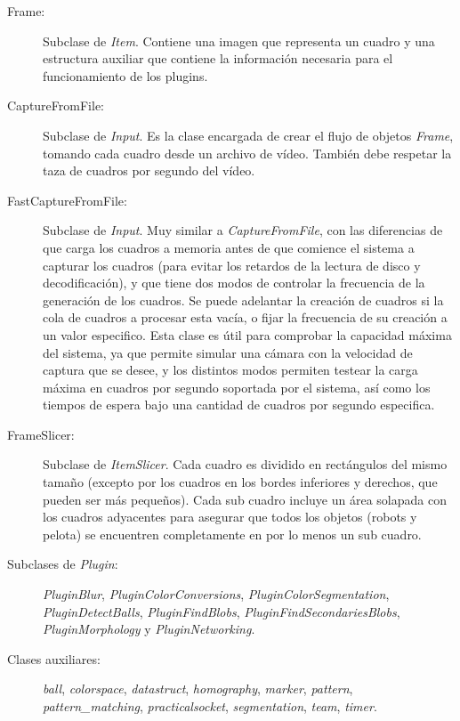 \begin{description}

	\item[Frame:] Subclase de \emph{Item}. Contiene una imagen que
		representa un cuadro y una estructura auxiliar que contiene la
		información necesaria para el funcionamiento de los plugins.

	\item[CaptureFromFile:] Subclase de \emph{Input}. Es la clase encargada
		de crear el flujo de objetos \emph{Frame}, tomando cada cuadro
		desde un archivo de vídeo. También debe respetar la taza de
		cuadros por segundo del vídeo.

	\item[FastCaptureFromFile:] Subclase de \emph{Input}. Muy similar a
		\emph{CaptureFromFile}, con las diferencias de que carga los
		cuadros a memoria antes de que comience el sistema a capturar
		los cuadros (para evitar los retardos de la lectura de disco y
		decodificación), y que tiene dos modos de controlar la
		frecuencia de la generación de los cuadros. Se puede adelantar
		la creación de cuadros si la cola de cuadros a procesar esta
		vacía, o fijar la frecuencia de su creación a un valor
		especifico. Esta clase es útil para comprobar la capacidad
		máxima del sistema, ya que permite simular una cámara con la
		velocidad de captura que se desee, y los distintos modos
		permiten testear la carga máxima en cuadros por segundo
		soportada por el sistema, así como los tiempos de espera bajo
		una cantidad de cuadros por segundo especifica.

	\item[FrameSlicer:] Subclase de \emph{ItemSlicer}. Cada cuadro es
		dividido en rectángulos del mismo tamaño (excepto por los
		cuadros en los bordes inferiores y derechos, que pueden ser
		más pequeños). Cada sub cuadro incluye un área solapada con
		los cuadros adyacentes para asegurar que todos los objetos
		(robots y pelota) se encuentren completamente en por lo menos
		un sub cuadro.

	\item[Subclases de \emph{Plugin}:] \emph{PluginBlur},
		\emph{PluginColorConversions}, \emph{PluginColorSegmentation},
		\emph{PluginDetectBalls}, \emph{PluginFindBlobs},
		\emph{PluginFindSecondariesBlobs}, \emph{PluginMorphology} y
		\emph{PluginNetworking}.

	\item[Clases auxiliares:] \emph{ball}, \emph{colorspace},
		\emph{datastruct}, \emph{homography}, \emph{marker},
		\emph{pattern}, \emph{pattern\_matching},
		\emph{practicalsocket}, \emph{segmentation}, \emph{team},
		\emph{timer}.

\end{description}

